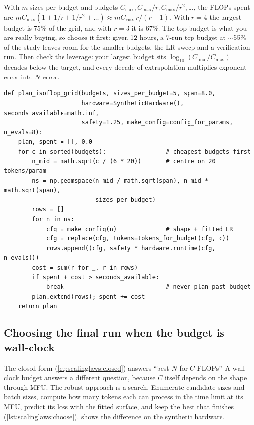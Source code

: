 \begin{napkinmath}
With $m$ sizes per budget and budgets $C_{\max}, C_{\max}/r, C_{\max}/r^2,\dots$, the FLOPs spent
are $mC_{\max}(1+1/r+1/r^2+\dots)\approx mC_{\max}\,r/(r-1)$. With $r=4$ the largest budget is
$75\%$ of the grid, and with $r=3$ it is $67\%$. The top budget is what you are really buying,
so choose it first: given 12 hours, a 7-run top budget at $\sim$55\% of the study leaves room
for the smaller budgets, the LR sweep and a verification run. Then check the leverage: your
largest budget sits $\log_{10}(C_{\text{final}}/C_{\max})$ decades below the target, and every
decade of extrapolation multiplies exponent error into $N$ error.
\end{napkinmath}

\begin{lstlisting}[caption={Planning an IsoFLOP grid and pricing it in wall-clock seconds (from \code{llmsys/scaling.py}).},label={lst:scalinglaws:plan}]
def plan_isoflop_grid(budgets, sizes_per_budget=5, span=8.0,
                      hardware=SyntheticHardware(), seconds_available=math.inf,
                      safety=1.25, make_config=config_for_params, n_evals=8):
    plan, spent = [], 0.0
    for c in sorted(budgets):                 # cheapest budgets first
        n_mid = math.sqrt(c / (6 * 20))       # centre on 20 tokens/param
        ns = np.geomspace(n_mid / math.sqrt(span), n_mid * math.sqrt(span),
                          sizes_per_budget)
        rows = []
        for n in ns:
            cfg = make_config(n)              # shape + fitted LR
            cfg = replace(cfg, tokens=tokens_for_budget(cfg, c))
            rows.append((cfg, safety * hardware.runtime(cfg, n_evals)))
        cost = sum(r for _, r in rows)
        if spent + cost > seconds_available:
            break                             # never plan past budget
        plan.extend(rows); spent += cost
    return plan
\end{lstlisting}

\subsection{Choosing the final run when the budget is wall-clock}\label{sec:scalinglaws:wallchoice}

The closed form (\cref{eq:scalinglaws:closed}) answers ``best $N$ for $C$ FLOPs''. A
wall-clock budget answers a different question, because $C$ itself depends on the shape through
MFU. The robust approach is a search. Enumerate candidate sizes and batch sizes, compute how
many tokens each can process in the time limit at its MFU, predict its loss with the fitted
surface, and keep the best that finishes (\cref{lst:scalinglaws:choose}).
 shows the difference on the synthetic hardware.


